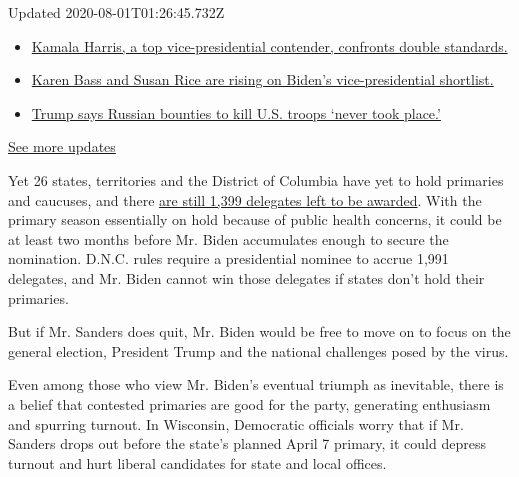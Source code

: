 Updated 2020-08-01T01:26:45.732Z

\begin{itemize}
\tightlist
\item
  \href{https://www.nytimes.com/2020/07/31/us/elections/biden-vs-trump.html?action=click\&pgtype=Article\&state=default\&region=MAIN_CONTENT_1\&context=storylines_live_updates\#link-29fdff45}{Kamala
  Harris, a top vice-presidential contender, confronts double
  standards.}
\item
  \href{https://www.nytimes.com/2020/07/31/us/elections/biden-vs-trump.html?action=click\&pgtype=Article\&state=default\&region=MAIN_CONTENT_1\&context=storylines_live_updates\#link-13ec3d9c}{Karen
  Bass and Susan Rice are rising on Biden's vice-presidential
  shortlist.}
\item
  \href{https://www.nytimes.com/2020/07/31/us/elections/biden-vs-trump.html?action=click\&pgtype=Article\&state=default\&region=MAIN_CONTENT_1\&context=storylines_live_updates\#link-49e9a016}{Trump
  says Russian bounties to kill U.S. troops `never took place.'}
\end{itemize}

\href{https://www.nytimes.com/2020/07/31/us/elections/biden-vs-trump.html?action=click\&pgtype=Article\&state=default\&region=MAIN_CONTENT_1\&context=storylines_live_updates}{See
more updates}

Yet 26 states, territories and the District of Columbia have yet to hold
primaries and caucuses, and there
\href{https://www.nytimes.com/interactive/2020/us/elections/delegate-count-primary-results.html}{are
still 1,399 delegates left to be awarded}. With the primary season
essentially on hold because of public health concerns, it could be at
least two months before Mr. Biden accumulates enough to secure the
nomination. D.N.C. rules require a presidential nominee to accrue 1,991
delegates, and Mr. Biden cannot win those delegates if states don't hold
their primaries.

But if Mr. Sanders does quit, Mr. Biden would be free to move on to
focus on the general election, President Trump and the national
challenges posed by the virus.

Even among those who view Mr. Biden's eventual triumph as inevitable,
there is a belief that contested primaries are good for the party,
generating enthusiasm and spurring turnout. In Wisconsin, Democratic
officials worry that if Mr. Sanders drops out before the state's planned
April 7 primary, it could depress turnout and hurt liberal candidates
for state and local offices.

